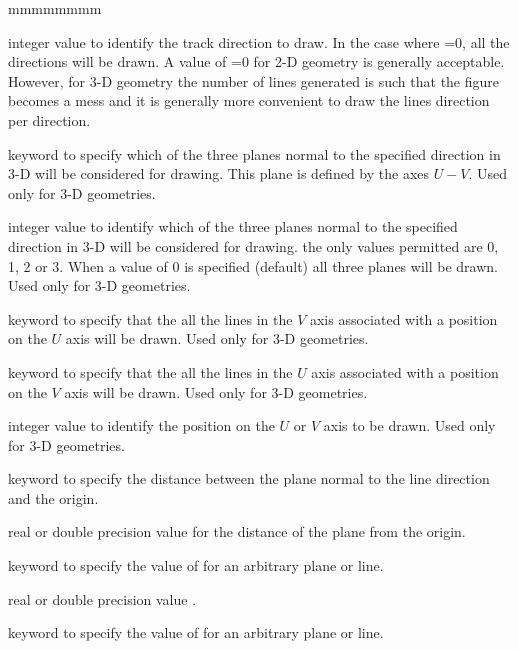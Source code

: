 \begin{ListeDeDescription}{mmmmmmmm}
\item[\dusa{idir}] integer value to identify the track direction to draw. In the case where =0, all the directions will be drawn. A value of  
=0 for 2-D geometry is generally acceptable. However, for 3-D geometry the number of lines generated is such that the figure becomes a mess and it
is generally more convenient to draw the lines direction per direction.

\item[\moc{PLAN}] keyword to specify which of the three planes normal to the specified direction in 3-D will be considered for drawing. This plane is defined
by the axes $U-V$. Used only for 3-D geometries.

\item[\dusa{iplan} ] integer value to identify which of the three planes normal to the specified direction in 3-D will be considered for drawing. the only
values permitted are 0, 1, 2 or 3. When a value of 0 is specified (default) all three planes will be drawn. Used only for 3-D geometries.

\item[\moc{U}] keyword to specify that the all the lines in the $V$ axis associated with a position on the $U$ axis will be drawn. Used only for 3-D geometries.

\item[\moc{V}] keyword to specify that the all the lines in the $U$ axis associated with a position on the $V$ axis will be drawn. Used only for 3-D geometries.

\item[\dusa{iuv}] integer value to identify the position on the $U$ or $V$ axis to be drawn. Used only for 3-D geometries.

\item[\moc{DIST}] keyword to specify the distance between the plane normal to the line direction and the origin.

\item[\dusa{dist} ] real or double precision value for the distance of the plane from the origin.

\item[\moc{A}] keyword to specify the value of  for an arbitrary plane or line.

\item[\dusa{a} ] real or double precision value .

\item[\moc{B}] keyword to specify the value of  for an arbitrary plane or line.


\end{ListeDeDescription}
